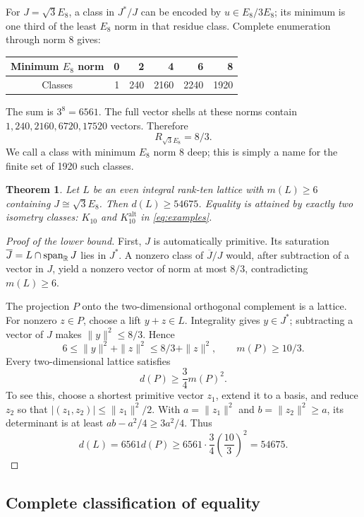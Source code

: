\documentclass[11pt,a4paper]{article}
\newtheorem{theorem}{Theorem}[section]
\theoremstyle{remark}\newtheorem{remark}[theorem]{Remark}
\newcommand{\spanR}{\operatorname{span}_{\R}}\newcommand{\diag}{\operatorname{diag}}
\newcommand{\Kalt}{K_{10}^{\mathrm{alt}}}
\begin{document}
For $J=\sqrt3E_8$, a class in $J^*/J$ can be encoded by $u\in E_8/3E_8$; its minimum is one third of the least $E_8$ norm in that residue class. Complete enumeration through norm 8 gives:
\begin{center}
\begin{tabular}{crrrrr}
\toprule
Minimum $E_8$ norm &0&2&4&6&8\\\midrule
Classes &1&240&2160&2240&1920\\
\bottomrule
\end{tabular}
\end{center}
The sum is $3^8=6561$. The full vector shells at these norms contain $1,240,2160,6720,17520$ vectors. Therefore
\begin{equation}\label{eq:e8radius}
R_{\sqrt3E_8}=8/3.
\end{equation}
We call a class with minimum $E_8$ norm 8 deep; this is simply a name for the finite set of 1920 such classes.

\begin{theorem}\label{thm:rank10e8}
Let $L$ be an even integral rank-ten lattice with $m(L)\ge6$ containing $J\cong\sqrt3E_8$. Then $d(L)\ge54675$. Equality is attained by exactly two isometry classes: $K_{10}$ and $\Kalt$ in \eqref{eq:examples}.
\end{theorem}

\begin{proof}[Proof of the lower bound]
First, $J$ is automatically primitive. Its saturation $\overline J=L\cap\spanR J$ lies in $J^*$. A nonzero class of $\overline J/J$ would, after subtraction of a vector in $J$, yield a nonzero vector of norm at most $8/3$, contradicting $m(L)\ge6$.

The projection $P$ onto the two-dimensional orthogonal complement is a lattice. For nonzero $z\in P$, choose a lift $y+z\in L$. Integrality gives $y\in J^*$; subtracting a vector of $J$ makes $\|y\|^2\le8/3$. Hence
\[
6\le\|y\|^2+\|z\|^2\le8/3+\|z\|^2,
\qquad m(P)\ge10/3.
\]
Every two-dimensional lattice satisfies
\[
d(P)\ge\frac34m(P)^2.
\]
To see this, choose a shortest primitive vector $z_1$, extend it to a basis, and reduce $z_2$ so that $|(z_1,z_2)|\le\|z_1\|^2/2$. With $a=\|z_1\|^2$ and $b=\|z_2\|^2\ge a$, its determinant is at least $ab-a^2/4\ge3a^2/4$. Thus
\[
d(L)=6561d(P)\ge6561\cdot\frac34\left(\frac{10}{3}\right)^2=54675.
\]
\end{proof}

\subsection{Complete classification of equality}
\end{document}

